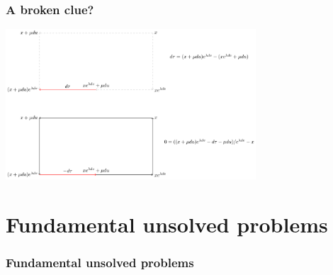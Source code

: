 \documentclass[aspectratio=169]{beamer}
\begin{document}
\begin{frame}
    \frametitle{A broken clue?}
    \begin{center}
        \includegraphics[width=0.7\textwidth]{../images/19-curl}
    \end{center}
\end{frame}

\section{Fundamental unsolved problems}

\begin{frame}
    \frametitle{Fundamental unsolved problems}
    \begin{figure}[ht]\centering
    \end{figure}
\end{frame}
\end{document}
